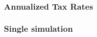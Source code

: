\documentclass[10pt]{beamer}
\begin{document}
  \begin{frame} \frametitle{Annualized Tax Rates}

    \begin{figure}
    \end{figure}

  \end{frame}

  \begin{frame} \frametitle{Single simulation}

      \begin{figure}
        \label{fig:dg_tax_growth}
      \end{figure}

  \end{frame}
\end{document}
